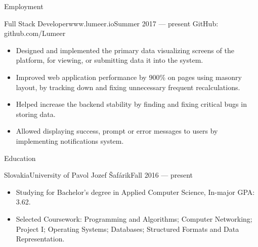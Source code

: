 \documentclass[]{mcdowellcv}
\begin{document}
	\makeheader
	
	\begin{cvsection}{Employment}
		\begin{cvsubsection}{Full Stack Developer}{www.lumeer.io}{Summer 2017 — present}
			GitHub: github.com/Lumeer
			\begin{itemize}
				\item Designed and implemented the primary data visualizing screens of the platform, for viewing, or submitting data it into the system.
				\item Improved web application performance by 900\% on pages using masonry layout, by tracking down and fixing unnecessary frequent recalculations.
				\item Helped increase the backend stability by finding and fixing critical bugs in storing data.
				\item Allowed displaying success, prompt or error messages to users by implementing notifications system.
			\end{itemize}
		\end{cvsubsection}
	\end{cvsection}
	
	\begin{cvsection}{Education}
		\begin{cvsubsection}{Slovakia}{University of Pavol Jozef Šafárik}{Fall 2016 — present}
			\begin{itemize}
				\item Studying for Bachelor's degree in Applied Computer Science, In-major GPA: 3.62.
				\item Selected Coursework: Programming and Algorithms; Computer Networking; Project I; Operating Systems; Databases; Structured Formats and Data Representation.
			\end{itemize}
		\end{cvsubsection}
	\end{cvsection}
	
\end{document}
